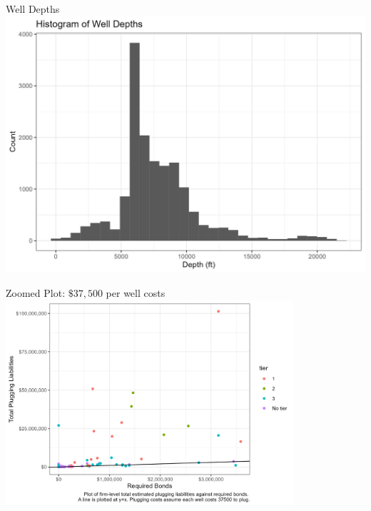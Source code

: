 \documentclass{beamer}
\begin{document}
\begin{frame}{Well Depths}
\label{depths}
\centering
    \includegraphics[scale=0.12]{Figures/DepthHistogram.jpg}\\
    \hyperlink{costcalc}{}
\end{frame}

\begin{frame}{Zoomed Plot: $\$37,500$ per well costs}
\label{Liability1Zoom}
\includegraphics[width=0.8\textwidth]{Figures/BondsLiabilities1_zoomed.jpg}\\
\hyperlink{Fig1}{}
\end{frame}
\end{document}
